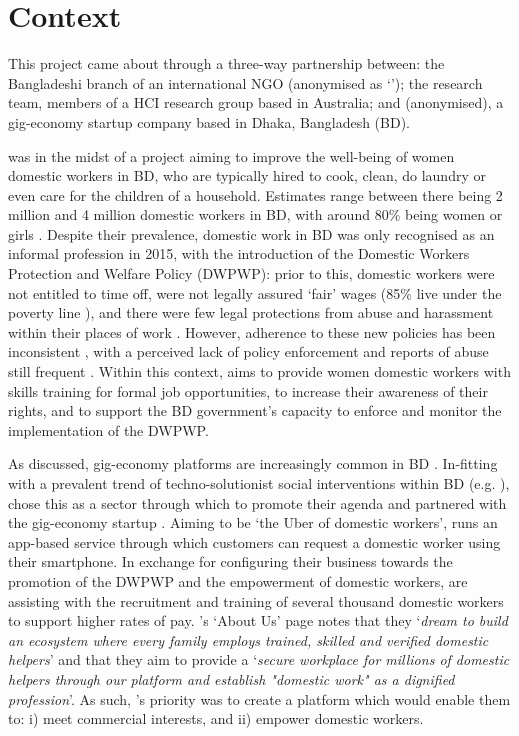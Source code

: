 \section{Context}

This project came about through a three-way partnership between: the Bangladeshi branch of an international NGO (anonymised as `\NGO{}'); the research team, members of a HCI research group based in Australia; and \PC{} (anonymised), a gig-economy startup company based in Dhaka, Bangladesh (BD).

\NGO{} was in the midst of a project aiming to improve the well-being of women domestic workers in BD, who are typically hired to cook, clean, do laundry or even care for the children of a household. Estimates range between there being 2 million \cite{DWRN2011} and 4 million \cite{Ashraf2019} domestic workers in BD, with around 80\% being women or girls \cite{Ashraf2019}. Despite their prevalence, domestic work in BD was only recognised as an informal profession in 2015, with the introduction of the Domestic Workers Protection and Welfare Policy (DWPWP): prior to this, domestic workers were not entitled to time off, were not legally assured `fair' wages (85\% live under the poverty line \cite{BILS2015}), and there were few legal protections from abuse and harassment within their places of work \cite{IDWF2015}. However, adherence to these new policies has been inconsistent \cite{islam2016}, with a perceived lack of policy enforcement and reports of abuse still frequent \cite{DailyStar2018}. Within this context, \NGO{} aims to provide women domestic workers with skills training for formal job opportunities, to increase their awareness of their rights, and to support the BD government's capacity to enforce and monitor the implementation of the DWPWP. 

As discussed, gig-economy platforms are increasingly common in BD \cite{Ahmed2020}. In-fitting with a prevalent trend of techno-solutionist social interventions within BD (e.g. \cite{hasnayen2016, Faroqi2019}), \NGO{} chose this as a sector through which to promote their agenda and partnered with the gig-economy startup \PC{}. Aiming to be `the Uber of domestic workers', \PC{} runs an app-based service through which customers can request a domestic worker using their smartphone. In exchange for configuring their business towards the promotion of the DWPWP and the empowerment of domestic workers, \NGO{} are assisting \PC{} with the recruitment and training of several thousand domestic workers to support higher rates of pay. \PC{}'s `About Us' page notes that they `\textit{dream to build an ecosystem where every family employs trained, skilled and verified domestic helpers}' and that they aim to provide a `\textit{secure workplace for millions of domestic helpers through our platform and establish "domestic work" as a dignified profession}'. As such, \PC{}'s priority was to create a platform which would enable them to: i) meet commercial interests, and ii) empower domestic workers.

